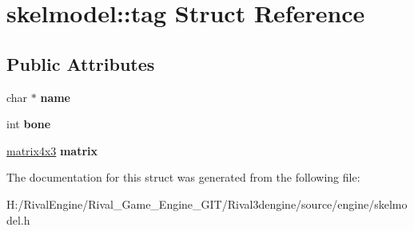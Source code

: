 \hypertarget{structskelmodel_1_1tag}{}\section{skelmodel\+:\+:tag Struct Reference}
\label{structskelmodel_1_1tag}
\subsection*{Public Attributes}
\begin{DoxyCompactItemize}
\item 
\mbox{\label{structskelmodel_1_1tag_a629f7dc31c14df93dc234b3ad218349e}} 
char $\ast$ {\bfseries name}
\item 
\mbox{\label{structskelmodel_1_1tag_a20d29fd98c8ff9b1d3eee41d84c28f58}} 
int {\bfseries bone}
\item 
\mbox{\label{structskelmodel_1_1tag_ab4635f4808f06e5df30275984b462611}} 
\hyperlink{structmatrix4x3}{matrix4x3} {\bfseries matrix}
\end{DoxyCompactItemize}


The documentation for this struct was generated from the following file\+:\begin{DoxyCompactItemize}
\item 
H\+:/\+Rival\+Engine/\+Rival\+\_\+\+Game\+\_\+\+Engine\+\_\+\+G\+I\+T/\+Rival3dengine/source/engine/skelmodel.\+h\end{DoxyCompactItemize}
